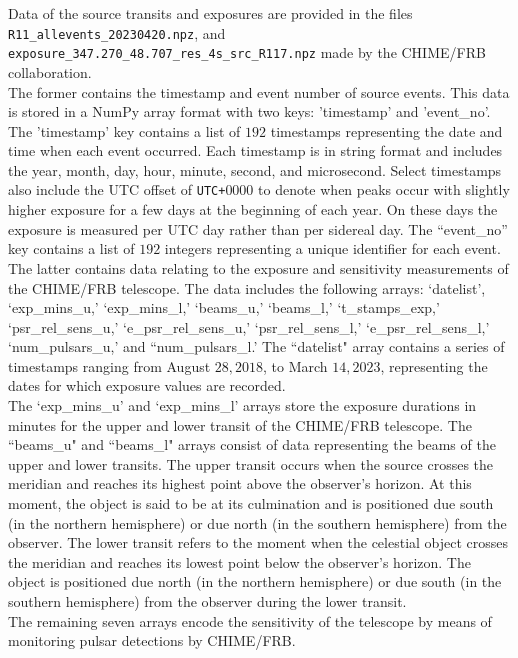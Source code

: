 \documentclass[twocolumn]{aastex631}
\begin{document}
\indent Data of the source transits and exposures are provided in the files \texttt{R11{\_}allevents{\_}20230420.npz}, and \texttt{exposure{\_}347.270{\_}48.707{\_}res{\_}4s{\_}src{\_}R117.npz} made by the CHIME/FRB collaboration.\\ 
\indent The former contains the timestamp and event number of source events. This data is stored in a NumPy array format with two keys: 'timestamp' and 'event{\_}no'. The 'timestamp' key contains a list of $192$ timestamps representing the date and time when each event occurred. Each timestamp is in string format and includes the year, month, day, hour, minute, second, and microsecond. Select timestamps also include the UTC offset of \texttt{UTC+$0000$} to denote when peaks occur with slightly higher exposure for a few days at the beginning of each year. On these days the exposure is measured per UTC day rather than per sidereal day. The ``event{\_}no'' key contains a list of $192$ integers representing a unique identifier for each event.\\
The latter contains data relating to the exposure and sensitivity measurements of the CHIME/FRB telescope. The data includes the following arrays: `datelist', `exp{\_}mins{\_}u,' `exp{\_}mins{\_}l,' `beams{\_}u,' `beams{\_}l,' `t{\_}stamps{\_}exp,' `psr{\_}rel{\_}sens{\_}u,' `e{\_}psr{\_}rel{\_}sens{\_}u,' `psr{\_}rel{\_}sens{\_}l,' `e{\_}psr{\_}rel{\_}sens{\_}l,' `num{\_}pulsars{\_}u,' and ``num{\_}pulsars{\_}l.' The ``datelist" array contains a series of timestamps ranging from August $28, 2018$, to March $14, 2023$, representing the dates for which exposure values are recorded.\\
\indent The `exp{\_}mins{\_}u' and `exp{\_}mins{\_}l' arrays store the exposure durations in minutes for the upper and lower transit of the CHIME/FRB telescope. The ``beams{\_}u" and ``beams{\_}l" arrays consist of data representing the beams of the upper and lower transits. The upper transit occurs when the source crosses the meridian and reaches its highest point above the observer's horizon. At this moment, the object is said to be at its culmination and is positioned due south (in the northern hemisphere) or due north (in the southern hemisphere) from the observer. The lower transit refers to the moment when the celestial object crosses the meridian and reaches its lowest point below the observer's horizon. The object is positioned due north (in the northern hemisphere) or due south (in the southern hemisphere) from the observer during the lower transit.\\
\indent The remaining seven arrays encode the sensitivity of the telescope by means of monitoring pulsar detections by CHIME/FRB.
\end{document}
